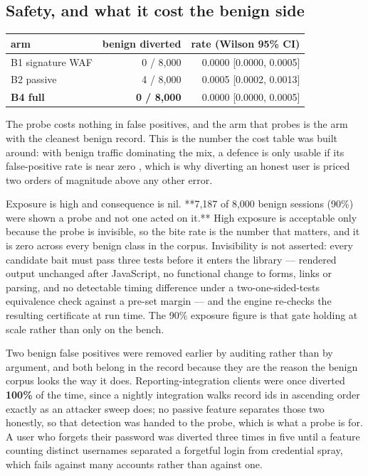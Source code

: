 \subsection{Safety, and what it cost the benign side}

\begin{table}[t]
\centering
\small
\begin{tabular}{lrr}
\toprule
arm & benign diverted & rate (Wilson 95\% CI) \\
\midrule
B1 signature WAF & 0 / 8,000 & 0.0000 [0.0000, 0.0005] \\
B2 passive & 4 / 8,000 & 0.0005 [0.0002, 0.0013] \\
\textbf{B4 full} & \textbf{0 / 8,000} & 0.0000 [0.0000, 0.0005] \\
\bottomrule
\end{tabular}
\end{table}


The probe costs nothing in false positives, and the arm that probes is the arm with
the cleanest benign record. This is the number the cost table was built around: with
benign traffic dominating the mix, a defence is only usable if its false-positive
rate is near zero \cite{axelsson2000baserate}, which is why diverting an honest user
is priced two orders of magnitude above any other error.

Exposure is high and consequence is nil. **7,187 of 8,000 benign sessions (90\%)
were shown a probe and not one acted on it.** High exposure is acceptable only
because the probe is invisible, so the bite rate is the number that matters, and it
is zero across every benign class in the corpus. Invisibility is not asserted: every
candidate bait must pass three tests before it enters the library --- rendered output
unchanged after JavaScript, no functional change to forms, links or parsing, and no
detectable timing difference under a two-one-sided-tests equivalence check against a
pre-set margin \cite{schuirmann1987comparison} --- and the engine re-checks the
resulting certificate at run time. The 90\% exposure figure is that gate holding at
scale rather than only on the bench.

Two benign false positives were removed earlier by auditing rather than by argument,
and both belong in the record because they are the reason the benign corpus looks
the way it does. Reporting-integration clients were once diverted \textbf{100\%} of the
time, since a nightly integration walks record ids in ascending order exactly as an
attacker sweep does; no passive feature separates those two honestly, so that
detection was handed to the probe, which is what a probe is for. A user who forgets
their password was diverted three times in five until a feature counting distinct
usernames separated a forgetful login from credential spray, which fails against
many accounts rather than against one.

